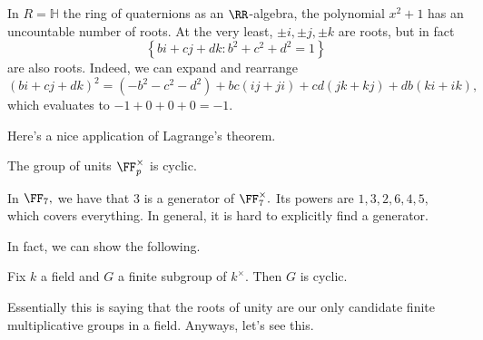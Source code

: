\begin{example}
	In $R=\mathbb H$ the ring of quaternions as an $\RR$-algebra, the polynomial $x^2+1$ has an uncountable number of roots. At the very least, $\pm i,\pm j,\pm k$ are roots, but in fact
	\[\left\{bi+cj+dk:b^2+c^2+d^2=1\right\}\]
	are also roots. Indeed, we can expand and rearrange
	\[(bi+cj+dk)^2=\left(-b^2-c^2-d^2\right)+bc(ij+ji)+cd(jk+kj)+db(ki+ik),\]
	which evaluates to $-1+0+0+0=-1.$
\end{example}
Here's a nice application of Lagrange's theorem.
\begin{theorem} \label{thm:primegen}
	The group of units $\FF_p^\times$ is cyclic.
\end{theorem}
\begin{example}
	In $\FF_7,$ we have that $3$ is a generator of $\FF_7^\times.$ Its powers are $1,3,2,6,4,5,$ which covers everything. In general, it is hard to explicitly find a generator.
\end{example}
In fact, we can show the following.
\begin{proposition}
	Fix $k$ a field and $G$ a finite subgroup of $k^\times.$ Then $G$ is cyclic.
\end{proposition}
Essentially this is saying that the roots of unity are our only candidate finite multiplicative groups in a field. Anyways, let's see this.
